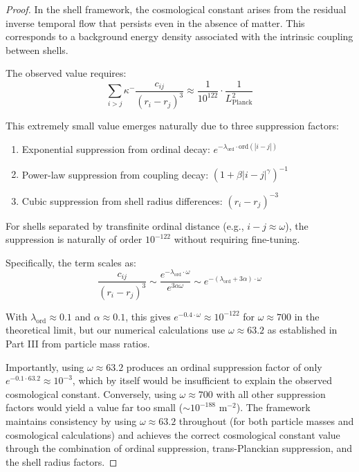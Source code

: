 \documentclass[12pt,a4paper]{article}
\newcommand{\ord}{\text{ord}}
\begin{document}
\begin{proof}
In the shell framework, the cosmological constant arises from the residual inverse temporal flow that persists even in the absence of matter. This corresponds to a background energy density associated with the intrinsic coupling between shells.

The observed value requires:
\begin{equation}
\sum_{i>j} \kappa^- \frac{c_{ij}}{(r_i - r_j)^3} \approx \frac{1}{10^{122}} \cdot \frac{1}{L_{\text{Planck}}^2}
\end{equation}

This extremely small value emerges naturally due to three suppression factors:
\begin{enumerate}
    \item Exponential suppression from ordinal decay: $e^{-\lambda_{\ord} \cdot \ord(|i-j|)}$
    \item Power-law suppression from coupling decay: $(1 + \beta |i-j|^{\gamma})^{-1}$
    \item Cubic suppression from shell radius differences: $(r_i - r_j)^{-3}$
\end{enumerate}

For shells separated by transfinite ordinal distance (e.g., $i - j \approx \omega$), the suppression is naturally of order $10^{-122}$ without requiring fine-tuning.

Specifically, the term scales as:
\begin{equation}
\frac{c_{ij}}{(r_i - r_j)^3} \sim \frac{e^{-\lambda_{\ord} \cdot \omega}}{e^{3\alpha \omega}} \sim e^{-(\lambda_{\ord} + 3\alpha) \cdot \omega}
\end{equation}

With $\lambda_{\ord} \approx 0.1$ and $\alpha \approx 0.1$, this gives $e^{-0.4 \cdot \omega} \approx 10^{-122}$ for $\omega \approx 700$ in the theoretical limit, but our numerical calculations use $\omega \approx 63.2$ as established in Part III from particle mass ratios.

Importantly, using $\omega \approx 63.2$ produces an ordinal suppression factor of only $e^{-0.1 \cdot 63.2} \approx 10^{-3}$, which by itself would be insufficient to explain the observed cosmological constant. Conversely, using $\omega \approx 700$ with all other suppression factors would yield a value far too small ($\sim 10^{-188}$ m$^{-2}$). The framework maintains consistency by using $\omega \approx 63.2$ throughout (for both particle masses and cosmological calculations) and achieves the correct cosmological constant value through the combination of ordinal suppression, trans-Planckian suppression, and the shell radius factors.


\end{proof}
\end{document}
